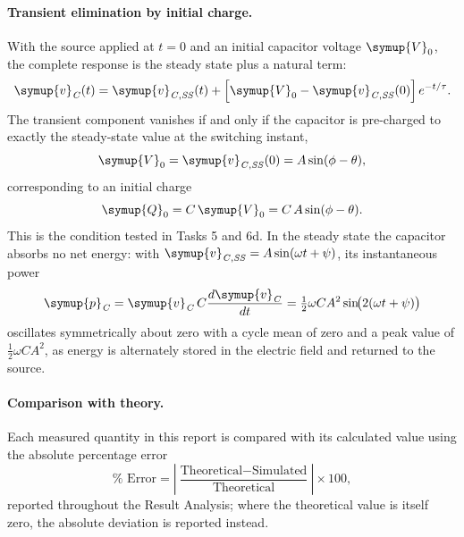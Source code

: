 \documentclass[12pt,a4paper]{article}
\begin{document}
	\paragraph{Transient elimination by initial charge.}
	With the source applied at $t = 0$ and an initial capacitor voltage
	$\symup{V}_{0}$, the complete response is the steady state plus a natural term:
	\begin{equation}
		\symup{v}_{\mathit{C}}(t) = \symup{v}_{\mathit{C,SS}}(t)
		+ \left[\symup{V}_{0} - \symup{v}_{\mathit{C,SS}}(0)\right] e^{-t/\tau}.
		\label{eq:complete-sine}
	\end{equation}
	The transient component vanishes if and only if the capacitor is
	pre-charged to exactly the steady-state value at the switching
	instant,
	\begin{equation}
		\symup{V}_{0} = \symup{v}_{\mathit{C,SS}}(0) = A \sin(\phi - \theta),
		\label{eq:ic-cond}
	\end{equation}
	corresponding to an initial charge
	\begin{equation}
		\symup{Q}_{0} = C\,\symup{V}_{0} = C\,A\sin(\phi - \theta).
		\label{eq:q0}
	\end{equation}
	This is the condition tested in Tasks 5 and 6d.  In the steady state
	the capacitor absorbs no net energy: with
	$\symup{v}_{\mathit{C,SS}} = A\sin(\omega t + \psi)$, its instantaneous power
	\begin{equation}
		\symup{p}_{\mathit{C}} = \symup{v}_{\mathit{C}}\,C\frac{d\symup{v}_{\mathit{C}}}{dt}
		= \tfrac{1}{2}\omega C A^{2}\sin\!\bigl(2(\omega t + \psi)\bigr)
		\label{eq:pcap}
	\end{equation}
	oscillates symmetrically about zero with a cycle mean of zero and a
	peak value of $\tfrac{1}{2}\omega C A^{2}$, as energy is alternately
	stored in the electric field and returned to the source.
	
	\paragraph{Comparison with theory.}
	Each measured quantity in this report is compared with its calculated
	value using the absolute percentage error
	\begin{equation}
		\% \text{ Error} =
		\left|\frac{\text{Theoretical} - \text{Simulated}}{\text{Theoretical}}\right|
		\times 100 ,
		\label{eq:perr}
	\end{equation}
	reported throughout the Result Analysis; where the theoretical value
	is itself zero, the absolute deviation is reported instead.
	
\end{document}
